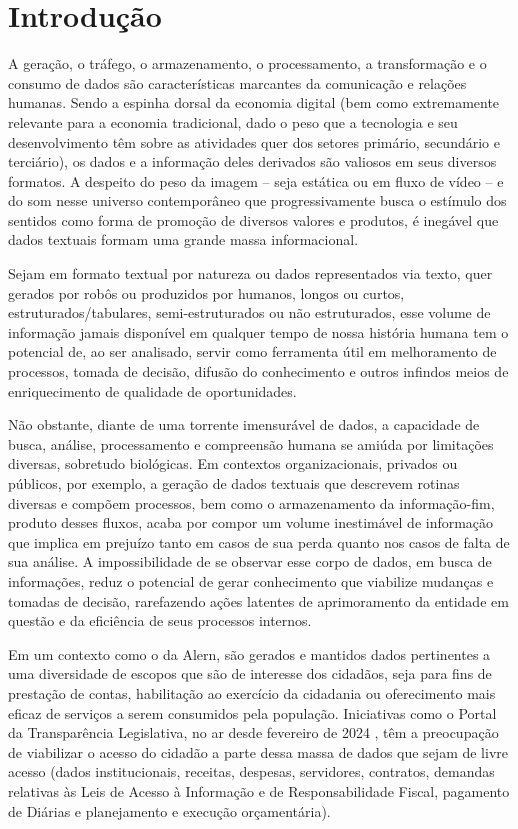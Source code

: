 \chapter{Introdução}
\label{cap:Introducao}

A geração, o tráfego, o armazenamento, o processamento, a transformação e o consumo de dados são características marcantes da comunicação e relações humanas. Sendo a espinha dorsal da economia digital (bem como extremamente relevante para a economia tradicional, dado o peso que a tecnologia e seu desenvolvimento têm sobre as atividades quer dos setores primário, secundário e terciário), os dados e a informação deles derivados são valiosos em seus diversos formatos. A despeito do peso da imagem -- seja estática ou em fluxo de vídeo -- e do som nesse universo contemporâneo que progressivamente busca o estímulo dos sentidos como forma de promoção de diversos valores e produtos, é inegável que dados textuais formam uma grande massa informacional.

Sejam em formato textual por natureza ou dados representados via texto, quer gerados por robôs ou produzidos por humanos, longos ou curtos, estruturados/tabulares, semi-estruturados ou não estruturados, esse volume de informação jamais disponível em qualquer tempo de nossa história humana tem o potencial de, ao ser analisado, servir como ferramenta útil em melhoramento de processos, tomada de decisão, difusão do conhecimento e outros infindos meios de enriquecimento de qualidade de oportunidades.

Não obstante, diante de uma torrente imensurável de dados, a capacidade de busca, análise, processamento e compreensão humana se amiúda por limitações diversas, sobretudo biológicas. Em contextos organizacionais, privados ou públicos, por exemplo, a geração de dados textuais que descrevem rotinas diversas e compõem processos, bem como o armazenamento da informação-fim, produto desses fluxos, acaba por compor um volume inestimável de informação que implica em prejuízo tanto em casos de sua perda quanto nos casos de falta de sua análise. A impossibilidade de se observar esse corpo de dados, em busca de informações, reduz o potencial de gerar conhecimento que viabilize mudanças e tomadas de decisão, rarefazendo ações latentes de aprimoramento da entidade em questão e da eficiência de seus processos internos.

Em um contexto como o da \ac{Alern}, são gerados e mantidos dados pertinentes a uma diversidade de escopos que são de interesse dos cidadãos, seja para fins de prestação de contas, habilitação ao exercício da cidadania ou oferecimento mais eficaz de serviços a serem consumidos pela população. Iniciativas como o Portal da Transparência Legislativa, no ar desde fevereiro de 2024 \cite{ALERN:3}, têm a preocupação de viabilizar o acesso do cidadão a parte dessa massa de dados que sejam de livre acesso (dados institucionais, receitas, despesas, servidores, contratos, demandas relativas às Leis de Acesso à Informação e de Responsabilidade Fiscal, pagamento de Diárias e planejamento e execução orçamentária).

